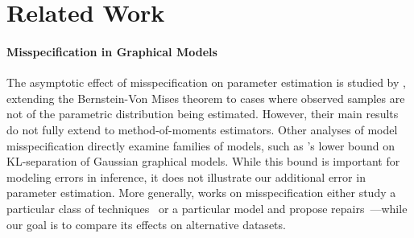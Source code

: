  \section{Related Work}

\paragraph{Misspecification in Graphical Models}
The asymptotic effect of misspecification on parameter estimation is studied by \cite{kleijn2012}, extending the Bernstein-Von Mises theorem to cases where observed samples are not of the parametric distribution being estimated. %
However, their main results do not fully extend to method-of-moments estimators. Other analyses of model misspecification directly examine families of models, such as \cite{JogL15}'s lower bound on KL-separation of Gaussian graphical models. While this bound is important for modeling errors in inference,
it does not illustrate our additional error in parameter estimation. More generally, works on misspecification either study a particular class of techniques~\citep{Blasi13} or a particular model and propose repairs~\citep{Grunwald17}---while our goal is to compare its effects on alternative datasets.

